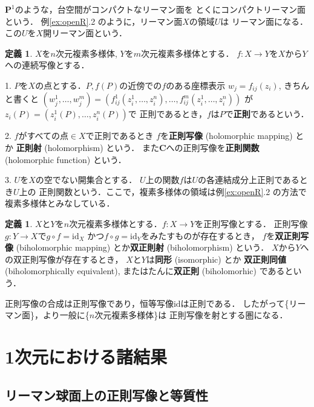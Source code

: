 \documentclass[11pt, a4paper, dvipdfmx, draft]{jsarticle}
\theoremstyle{definition}
\newtheorem{Definition}[Axiom]{定義}
\newcommand{\cc}{\mathbf{C}}
\newcommand{\pp}{\mathbf{P}}
\newcommand{\id}{\mathrm{id}}
\theoremstyle{mystyle}
\numberwithin{equation}{section} %
\begin{document}
$\pp^1$のような，台空間がコンパクトなリーマン面を
とくにコンパクトリーマン面という．
例\ref{ex:openR}.2 のように，リーマン面$X$の領域$U$は
リーマン面になる．この$U$を$X$開リーマン面という．

\begin{Definition}
    $X$を$n$次元複素多様体, $Y$を$m$次元複素多様体とする．
    $f\colon X\to Y$を$X$から$Y$への連続写像とする．
    
    1. 
    $P$を$X$の点とする．$P, f(P)$の近傍での$f$のある座標表示
    $w_j=f_{ij}(z_i)$, きちんと書くと
    $(w_{j}^{1},\dots,w_{j}^{m})
    =\left(f_{ij}^{1}(z_{i}^{1},\dots,z_{i}^{n}),\dots,f_{ij}^{m}(z_{i}^{1},\dots,z_{i}^{n})\right)$
    が$z_i(P)=(z_{i}^{1}(P),\dots,z_{i}^{n}(P))$で
    正則であるとき，$f$は$P$で\textbf{正則}であるという．
    
    2. 
    $f$がすべての点$\in X$で正則であるとき
    $f$を\textbf{正則写像} (holomorphic mapping) とか
    \textbf{正則射} (holomorphism) という．
    また$\cc$への正則写像を\textbf{正則関数} (holomorphic 
    function) という．

    3. 
    $U$を$X$の空でない開集合とする．
    $U$上の関数$f$は$U$の各連結成分上正則であるとき$U$上の
    正則関数という．ここで，複素多様体の領域は例\ref{ex:openR}.2 の方法で
    複素多様体とみなしている．
\end{Definition}

\begin{Definition}
    $X$と$Y$を$n$次元複素多様体とする．$f\colon X\to Y$を正則写像とする．
    正則写像$g\colon Y\to X$で$g\circ f=\id_X$
    かつ$f\circ g=\id_Y$をみたすものが存在するとき，
    $f$を\textbf{双正則写像} (biholomorphic mapping) とか\textbf{双正則射} (biholomorphism) という．
    $X$から$Y$への双正則写像が存在するとき，
    $X$と$Y$は\textbf{同形} (isomorphic) とか 
    \textbf{双正則同値} (biholomorphically equivalent), 
    またはたんに\textbf{双正則} (biholomorhic) であるという．
\end{Definition}

正則写像の合成は正則写像であり，恒等写像$\id$は正則である．
したがって\{リーマン面\}，より一般に\{$n$次元複素多様体\}は
正則写像を射とする圏になる．

\section{1次元における諸結果}



\subsection{リーマン球面上の正則写像と等質性}
\end{document}
